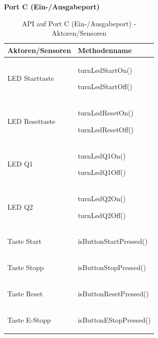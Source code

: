\documentclass[a4paper, 11pt]{article}
\begin{document}
\newpage

\noindent\textbf{Port C (Ein-/Ausgabeport)}
\begin{table}[H]
\center
    \begin{tabularx}{\textwidth}{|X|X|}
    \hline
    \textbf{Aktoren/Sensoren}&\textbf{Methodenname}\\
    \hline
    LED Starttaste&\begin{compactenum}[]
        \item \ttfamily turnLedStartOn()
        \item \ttfamily turnLedStartOff()
    \end{compactenum}\\
    \hline
    LED Resettaste&\begin{compactenum}[]
        \item \ttfamily turnLedResetOn()
        \item \ttfamily turnLedResetOff()
    \end{compactenum}\\
    \hline
    LED Q1&\begin{compactenum}[]
        \item \ttfamily turnLedQ1On()
        \item \ttfamily turnLedQ1Off()
    \end{compactenum}\\
    \hline
    LED Q2&\begin{compactenum}[]
        \item \ttfamily turnLedQ2On()
        \item \ttfamily turnLedQ2Off()
    \end{compactenum}\\
    \hline
    Taste Start&\begin{compactenum}[]
        \item \ttfamily isButtonStartPressed()
    \end{compactenum}\\
    \hline
    Taste Stopp&\begin{compactenum}[]
        \item \ttfamily isButtonStopPressed()
    \end{compactenum}\\
    \hline
    Taste Reset&\begin{compactenum}[]
        \item \ttfamily isButtonResetPressed()
    \end{compactenum}\\
    \hline
    Taste E-Stopp&\begin{compactenum}[]
        \item \ttfamily isButtonEStopPressed()
    \end{compactenum}\\
    \hline
    \end{tabularx}
    \caption{API auf Port C (Ein-/Ausgabeport) - Aktoren/Sensoren}
    \label{portC}
\end{table}
\end{document}
